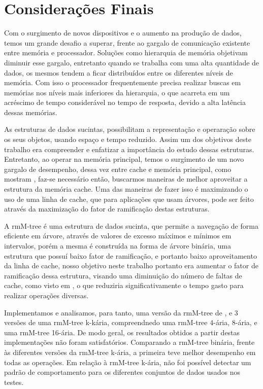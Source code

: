 \chapter{Considerações Finais}\label{chp:conclusao}

Com o surgimento de novos dispositivos e o aumento na produção de dados, temos um grande desafio a superar, frente ao gargalo de comunicação existente entre memória e processador. Soluções como hierarquia de memória objetivam diminuir esse gargalo, entretanto quando se trabalha com uma alta quantidade de dados, os mesmos tendem a ficar distribuídos entre os diferentes níveis de memória. Com isso o processador frequentemente precisa realizar buscas em memórias  nos níveis mais inferiores da hierarquia, o que acarreta em um acréscimo de tempo considerável no tempo de resposta, devido a alta latência dessas memórias.

As estruturas de dados sucintas, possibilitam a representação e operaração sobre os seus objetos, usando espaço e tempo reduzido. Assim um dos objetivos deste trabalho era compreender e enfatizar a importância do estudo dessas estruturas. Entretanto, ao operar na memória principal, temos o surgimento de um novo gargalo de desempenho, dessa vez entre cache e memória principal, como mostram \citet{paper-making-btree-cache}, faz-se necessário então, buscarmos maneiras de melhor aproveitar a estrutura da memória cache. Uma das maneiras de fazer isso é maximizando o uso de uma linha de cache, que para aplicações que usam árvores, pode ser feito através da maximização do fator de ramificação destas estruturas. 

A rmM-tree é uma estrutura de dados sucinta, que permite a navegação de forma eficiente em árvore, através de valores de excesso máximos e mínimos em intervalos, porém a mesma é construída na forma de árvore binária, uma estrutura que possuí baixo fator de ramificação, e portanto baixo aproveitamento da linha de cache, nosso objetivo neste trabalho portanto era aumentar o fator de ramificação dessa estrutura, visando  uma diminuição do número de faltas de cache, como visto em \citep{paper-making-btree-cache}, o que reduziria significativamente o tempo gasto para realizar operações diversas. 

Implementamos e analisamos, para tanto, uma versão da rmM-tree de \citet{book-compact-data-structures}, e 3 versões de uma rmM-tree k-kária, compreendnedo uma rmM-tree 4-ária, 8-ária, e uma rmM-tree 16-ária. De modo geral, os resultados obtidos a partir destas implementações não foram satisfatórios. Comparando a rmM-tree binária, frente às diferentes versões da rmM-tree k-ária, a primeira teve melhor desempenho em todas as operações. Em relação à rmM-tree k-ária, não foi possível detectar um padrão de comportamento para os diferentes conjuntos de dados usados nos testes. 

